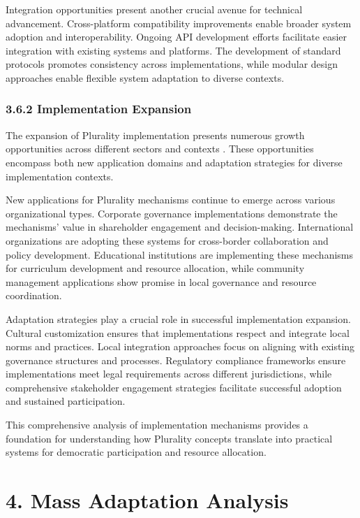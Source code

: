 Integration opportunities present another crucial avenue for technical advancement. Cross-platform compatibility improvements enable broader system adoption and interoperability. Ongoing API development efforts facilitate easier integration with existing systems and platforms. The development of standard protocols promotes consistency across implementations, while modular design approaches enable flexible system adaptation to diverse contexts.

\hypertarget{implementation-expansion}{%
\subsubsection{3.6.2 Implementation Expansion}\label{implementation-expansion}}

The expansion of Plurality implementation presents numerous growth opportunities across different sectors and contexts \citep{weyl2022decentralized}. These opportunities encompass both new application domains and adaptation strategies for diverse implementation contexts.

New applications for Plurality mechanisms continue to emerge across various organizational types. Corporate governance implementations demonstrate the mechanisms' value in shareholder engagement and decision-making. International organizations are adopting these systems for cross-border collaboration and policy development. Educational institutions are implementing these mechanisms for curriculum development and resource allocation, while community management applications show promise in local governance and resource coordination.

Adaptation strategies play a crucial role in successful implementation expansion. Cultural customization ensures that implementations respect and integrate local norms and practices. Local integration approaches focus on aligning with existing governance structures and processes. Regulatory compliance frameworks ensure implementations meet legal requirements across different jurisdictions, while comprehensive stakeholder engagement strategies facilitate successful adoption and sustained participation.

This comprehensive analysis of implementation mechanisms provides a foundation for understanding how Plurality concepts translate into practical systems for democratic participation and resource allocation.

\hypertarget{mass-adaptation-analysis}{%
\section{4. Mass Adaptation Analysis}\label{mass-adaptation-analysis}}

